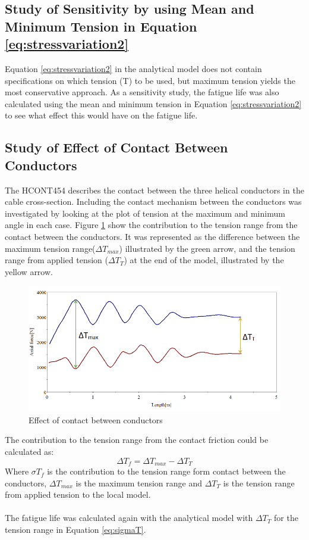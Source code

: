 \subsection{Study of Sensitivity by using Mean and Minimum Tension in Equation \ref{eq:stressvariation2}}
\label{sec:min}
Equation \ref{eq:stressvariation2}  in the analytical model does not contain specifications on which tension (T) to be used, but maximum tension yields the most conservative approach.  As a sensitivity study, the fatigue life was also calculated using the mean and minimum tension in Equation \ref{eq:stressvariation2} to see what effect this would have on the fatigue life. 
\subsection{Study of Effect of Contact Between Conductors}
The HCONT454 describes the contact between the three helical conductors in the cable cross-section. Including the contact mechanism between the conductors was investigated by looking at the plot of tension at the maximum and minimum angle in each case. Figure \ref{fig:condfric} show the contribution to the tension range from the contact between the conductors. It was represented as the difference between the maximum tension range($\Delta T_{max}$) illustrated by the green arrow, and the tension range from applied tension ($\Delta T_T$) at the end of the model, illustrated by the yellow arrow.

\begin{figure}[H]
\centering
\includegraphics[scale=0.7]{figures/confric.PNG}
\caption[$\; \:$Effect of contact between conductors]{Effect of contact between conductors}
 \label{fig:condfric}
\end{figure}
The contribution to the tension range from the contact friction could be calculated as:
\begin{equation}
    \Delta T_f = \Delta T_{max} - \Delta T_T
\end{equation}
Where $\sigma T_f$ is the contribution to the tension range form contact between the conductors, $\Delta T_{max}$ is the maximum tension range and $\Delta T_T$ is the tension range from applied tension to the local model. \\\\The fatigue life was calculated again with the analytical model with $\Delta T_T$ for the tension range in Equation \ref{eq:sigmaT}.

